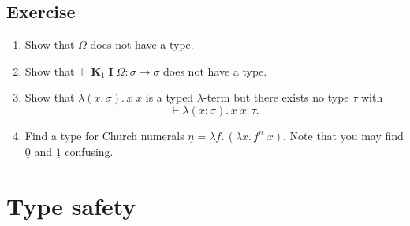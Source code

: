 \subsection*{Exercise}
\begin{enumerate}
  \item Show that $\Omega$ does not have a type.
  \item Show that $\vdash \mathbf{K}_1\;\mathbf{I}\;\Omega : \sigma \to \sigma$
    does not have a type.
  \item Show that $\lambda (x : \sigma).\, x\; x$ is a typed $\lambda$-term but
    there exists no type $\tau$ with 
    \[
      \vdash \lambda (x : \sigma).\, x\; x : \tau.
    \]
  \item Find a type for Church numerals $\underline{n} = \lambda f.\,(\lambda
    x.\, f^n\;x)$. Note that you may find $\underline{0}$ and $\underline{1}$
    confusing.
  \end{enumerate}
\section{Type safety}

